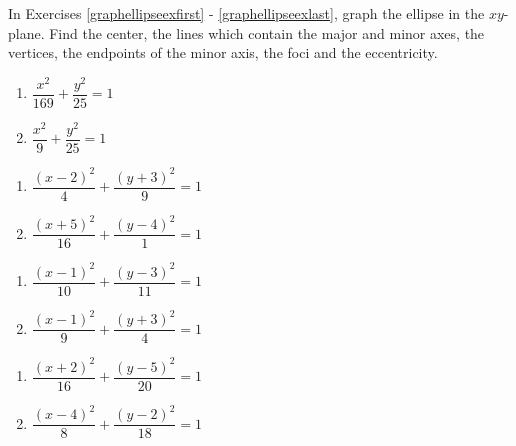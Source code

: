 \documentclass{ximera}
\begin{document}
	\author{Stitz-Zeager}


\label{ExercisesforEllipses}

In Exercises \ref{graphellipseexfirst} - \ref{graphellipseexlast},  graph the ellipse in the $xy$-plane.  Find the center, the lines which contain the major and minor axes, the vertices, the endpoints of the minor axis, the foci and the eccentricity.

\begin{multicols}{2}
\begin{enumerate}

\item $\dfrac{x^{2}}{169} + \dfrac{y^{2}}{25} = 1$  \label{graphellipseexfirst} \label{oddellipseone}
\item $\dfrac{x^2}{9} + \dfrac{y^2}{25} = 1$



\setcounter{HW}{\value{enumi}}
\end{enumerate}
\end{multicols}

\begin{multicols}{2}
\begin{enumerate}
\setcounter{enumi}{\value{HW}}

\item $\dfrac{(x - 2)^{2}}{4} + \dfrac{(y + 3)^{2}}{9} = 1$   \label{oddellipsethree}
\item $\dfrac{(x + 5)^{2}}{16} + \dfrac{(y - 4)^{2}}{1} = 1$


\setcounter{HW}{\value{enumi}}
\end{enumerate}
\end{multicols}

\begin{multicols}{2}
\begin{enumerate}
\setcounter{enumi}{\value{HW}}

\item $\dfrac{(x - 1)^{2}}{10} + \dfrac{(y - 3)^{2}}{11} = 1$   \label{oddellipsefive}
\item $\dfrac{(x-1)^2}{9}+\dfrac{(y+3)^2}{4} = 1$


\setcounter{HW}{\value{enumi}}
\end{enumerate}
\end{multicols}

\begin{multicols}{2}
\begin{enumerate}
\setcounter{enumi}{\value{HW}}

\item $\dfrac{(x+2)^2}{16}+\dfrac{(y-5)^2}{20} = 1$   \label{oddellipseseven}
\item $\dfrac{(x-4)^2}{8} + \dfrac{(y-2)^2}{18} = 1$ \label{graphellipseexlast}

\setcounter{HW}{\value{enumi}}
\end{enumerate}
\end{multicols}
\end{document}
